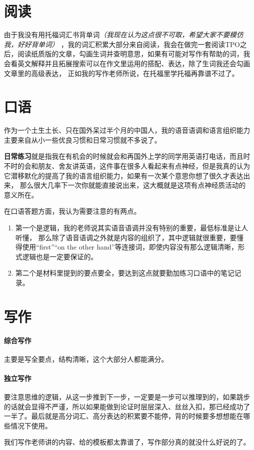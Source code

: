\documentclass[blue,cn, normal]{elegantnoteex}
\begin{document}
\section{阅读}

    由于我没有用托福词汇书背单词\textsl{（我现在认为这点很不可取，希望大家不要模仿我，好好背单词）}
    ，我的词汇积累大部分来自阅读，我会在做完一套阅读TPO之后，阅读纸质版的文章，勾画生词并查明意思，如果有可能对写作有帮助的词，我会看英文解释并且拓展搜索可以在作文里运用的搭配、表达，除了生词我还会勾画文章里的高级表达，
    正如我的写作老师所说，在托福里学托福再靠谱不过了。

\section{口语}
    作为一个土生土长、只在国外呆过半个月的中国人，我的语音语调和语言组织能力主要来自从小一些优良习惯和日常习惯就不多说了。
    
    \textbf{日常练习}就是指我在有机会的时候就会和再国外上学的同学用英语打电话，而且时不时的会和朋友、舍友讲英语，这件事在很多人看起来有点神经，但是我真的认为它潜移默化的提高了我的语言组织能力，如果有一次某个意思你想了很久才表达出来，
    那么很大几率下一次你就能直接说出来，这大概就是这项有点神经质活动的意义所在。


    在口语答题方面，我认为需要注意的有两点。
\begin{enumerate}
    \item 第一个是逻辑，我的老师说其实语音语调并没有特别的重要，最低标准是让人听懂，
    那么除了语音语调之外就是内容的组织了，其中逻辑就很重要，要懂得使用“first”“on the other hand”等连接词，即使内容没有那么逻辑清晰，形式逻辑也是一定要保证的。
    \item 第二个是材料里提到的要点要全，要达到这点就要勤加练习口语中的笔记记录。
\end{enumerate}


\section{写作}
\paragraph{综合写作}主要是写全要点，结构清晰，这个大部分人都能满分。
\paragraph{独立写作}要注意思维的逻辑，从这一步推到下一步，一定要是一步可以推理到的，如果跳步的话就会显得不严谨，所以如果能做到论证时层层深入、丝丝入扣，那已经成功了一半了。最后就是高分词汇、高分表达的积累要不能停，背的时候要多想想能在哪些情况下使用。


\begin{note}
	我们写作老师讲的内容、给的模板都太靠谱了，写作部分真的就没什么好说的了。
	
\end{note}
    
\end{document}

